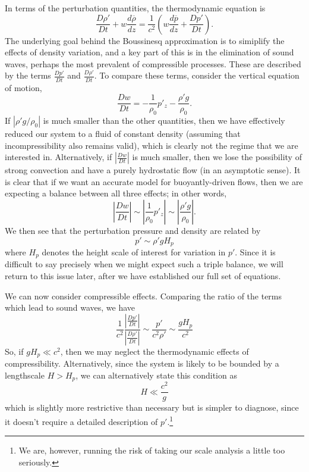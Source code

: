 \documentclass[letterpaper, 11pt]{article}
\begin{document}
In terms of the perturbation quantities, the thermodynamic equation is
\begin{equation}\label{ExactThermoEqn}
\frac{D \rho'}{D t} + w \frac{d \overline{\rho}}{d z} = \frac{1}{c^2} \left(w \frac{d \overline{p}}{d z} + \frac{D p'}{D t} \right).
\end{equation}
The underlying goal behind the Boussinesq approximation is to simiplify the effects of density variation, and a key part of this is in the elimination of sound waves, perhaps the most prevalent of compressible processes. These are described by the terms $\frac{D p'}{D t}$ and $\frac{D \rho'}{D t}$. To compare these terms, consider the vertical equation of motion,
\begin{equation}
\frac{D w}{D t} = -\frac{1}{\rho_0} p'_z - \frac{\rho' g}{\rho_0}.
\end{equation}
If $|\rho' g / \rho_0|$ is much smaller than the other quantities, then we have effectively reduced our system to a fluid of constant density (assuming that incompressibility also remains valid), which is clearly not the regime that we are interested in. Alternatively, if $\left|\frac{D w}{D t}\right|$ is much smaller, then we lose the possibility of strong convection and have a purely hydrostatic flow (in an asymptotic sense). It is clear that if we want an accurate model for buoyantly-driven flows, then we are expecting a balance between all three effects; in other words,
\begin{equation}\label{ConvectiveScale}
\left|\frac{D w}{D t}\right| \sim \left|\frac{1}{\rho_0} p'_z \right| \sim \left|\frac{\rho' g}{\rho_0}\right|.
\end{equation}
We then see that the perturbation pressure and density are related by
\begin{equation}
p' \sim \rho' g H_p
\end{equation}
where $H_p$ denotes the height scale of interest for variation in $p'$. Since it is difficult to say precisely when we might expect such a triple balance, we will return to this issue later, after we have established our full set of equations.

We can now consider compressible effects. Comparing the ratio of the terms which lead to sound waves, we have
\begin{equation}
\frac{1}{c^2} \frac{\left|\frac{D p'}{D t}\right|} {\left|\frac{D \rho'}{D t}\right|} \sim \frac{p'}{c^2 \rho'} \sim \frac{g H_p}{c^2}
\end{equation}
So, if $g H_p \ll c^2$, then we may neglect the thermodynamic effects of compressibility. Alternatively, since the system is likely to be bounded by a lengthscale $H > H_p$, we can alternatively state this condition as
\begin{equation*}
H \ll \frac{c^2}{g}
\end{equation*}
which is slightly more restrictive than necessary but is simpler to diagnose, since it doesn't require a detailed description of $p'$.\footnote{We are, however, running the risk of taking our scale analysis a little too seriously.}
\end{document}
